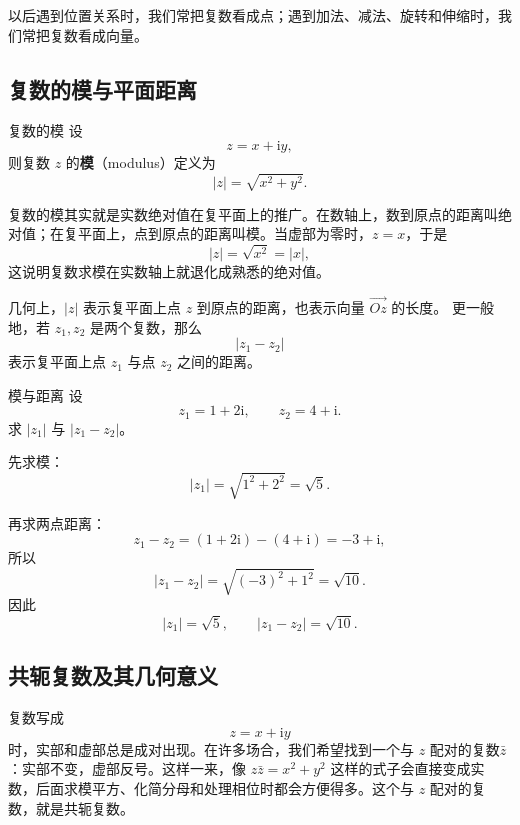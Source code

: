 \begin{zhu}{}{}
以后遇到位置关系时，我们常把复数看成点；遇到加法、减法、旋转和伸缩时，我们常把复数看成向量。
\end{zhu}

\subsection{复数的模与平面距离}

\begin{dingliyi}{复数的模}{}
设
\[
z=x+\mathrm{i}y,
\]
则复数 $z$ 的\textbf{模}（modulus）定义为
\begin{equation}
    |z|=\sqrt{x^2+y^2}.
\end{equation}
\end{dingliyi}

复数的模其实就是实数绝对值在复平面上的推广。在数轴上，数到原点的距离叫绝对值；在复平面上，点到原点的距离叫模。当虚部为零时，$z=x$，于是
\[
|z|=\sqrt{x^2}=|x|,
\]
这说明复数求模在实数轴上就退化成熟悉的绝对值。

几何上，$|z|$ 表示复平面上点 $z$ 到原点的距离，也表示向量 $\overrightarrow{Oz}$ 的长度。
更一般地，若 $z_1,z_2$ 是两个复数，那么
\begin{equation}
    |z_1-z_2|
\end{equation}
表示复平面上点 $z_1$ 与点 $z_2$ 之间的距离。

\begin{lizi}{模与距离}{}
设
\[
z_1=1+2\mathrm{i},\qquad z_2=4+\mathrm{i}.
\]
求 $|z_1|$ 与 $|z_1-z_2|$。

\begin{jie}
先求模：
\[
|z_1|=\sqrt{1^2+2^2}=\sqrt{5}.
\]

再求两点距离：
\[
z_1-z_2=(1+2\mathrm{i})-(4+\mathrm{i})=-3+\mathrm{i},
\]
所以
\[
|z_1-z_2|=\sqrt{(-3)^2+1^2}=\sqrt{10}.
\]
因此
\[
|z_1|=\sqrt{5},\qquad |z_1-z_2|=\sqrt{10}.
\]
\end{jie}
\end{lizi}

\subsection{共轭复数及其几何意义}

复数写成
\[
z=x+\mathrm{i}y
\]
时，实部和虚部总是成对出现。在许多场合，我们希望找到一个与 $z$ 配对的复数$\bar z$：实部不变，虚部反号。这样一来，像 $z\bar z=x^2+y^2$ 这样的式子会直接变成实数，后面求模平方、化简分母和处理相位时都会方便得多。这个与 $z$ 配对的复数，就是共轭复数。

